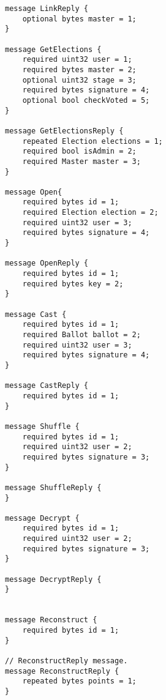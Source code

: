 \begin{lstlisting}[caption={Protobuf API Specification}, captionpos=b, language=protobuf2, style=protobuf]
message LinkReply {
    optional bytes master = 1;
}

message GetElections {
    required uint32 user = 1;
    required bytes master = 2;
    optional uint32 stage = 3;
    required bytes signature = 4;
    optional bool checkVoted = 5;
}

message GetElectionsReply {
    repeated Election elections = 1;
    required bool isAdmin = 2;
    required Master master = 3;
}

message Open{
    required bytes id = 1;
    required Election election = 2;
    required uint32 user = 3;
    required bytes signature = 4;
}

message OpenReply {
    required bytes id = 1;
    required bytes key = 2;
}

message Cast {
    required bytes id = 1;
    required Ballot ballot = 2;
    required uint32 user = 3;
    required bytes signature = 4;
}

message CastReply {
    required bytes id = 1;
}

message Shuffle {
    required bytes id = 1;
    required uint32 user = 2;
    required bytes signature = 3;
}

message ShuffleReply {
}

message Decrypt {
    required bytes id = 1;
    required uint32 user = 2;
    required bytes signature = 3;
}

message DecryptReply {
}


message Reconstruct {
	required bytes id = 1;
}

// ReconstructReply message.
message ReconstructReply {
	repeated bytes points = 1;
}
\end{lstlisting}
